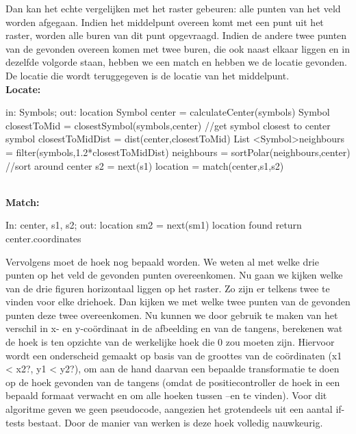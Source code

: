 \documentclass[eind]{penoverslag}
\begin{document}
Dan kan het echte vergelijken met het raster gebeuren: alle punten van het veld worden afgegaan. Indien het middelpunt overeen komt met een punt uit het raster, worden alle buren van dit punt opgevraagd. Indien de andere twee punten van de gevonden overeen komen met twee buren, die ook naast elkaar liggen en in dezelfde volgorde staan, hebben we een match en hebben we de locatie gevonden. De locatie die wordt teruggegeven is de locatie van het middelpunt.\\

\textbf{Locate: }
\begin{algorithmic}

	\STATE in: Symbols; out: location
	\STATE Symbol center = calculateCenter(symbols)
	\STATE Symbol closestToMid = closestSymbol(symbols,center)     //get symbol closest to center symbol
	\STATE closestToMidDist = dist(center,closestToMid)
	\STATE List \textless Symbol\textgreater neighbours = filter(symbols,1.2*closestToMidDist)
	\STATE neighbours = sortPolar(neighbours,center)     //sort around center
		\STATE s2 = next(s1) %
			\STATE location = match(center,s1,s2)
		\ENDIF
	\ENDFOR
	
\end{algorithmic}
~\\
\textbf{Match:}
\begin{algorithmic}
\STATE In: center, s1, s2; out: location
				\STATE sm2 = next(sm1)
					\STATE location found
					\STATE return center.coordinates
				\ENDIF
			\ENDFOR
		\ENDIF
	\ENDFOR
\end{algorithmic}

Vervolgens moet de hoek nog bepaald worden. We weten al met welke drie punten op het veld de gevonden punten overeenkomen. Nu gaan we kijken welke van de drie figuren horizontaal liggen op het raster. Zo zijn er telkens twee te vinden voor elke driehoek. Dan kijken we met welke twee punten van de gevonden punten deze twee overeenkomen. Nu kunnen we door gebruik te maken van het verschil in x- en y-co\"{o}rdinaat in de afbeelding en van de tangens, berekenen wat de hoek is ten opzichte van de werkelijke hoek die 0 zou moeten zijn.
Hiervoor wordt een onderscheid gemaakt op basis van de groottes van de coördinaten (x1 < x2?, y1 < y2?), om aan de hand daarvan een bepaalde transformatie te doen op de hoek gevonden van de tangens (omdat de positiecontroller de hoek in een bepaald formaat verwacht en om alle hoeken tussen –\pi en \pi te vinden). Voor dit algoritme geven we geen pseudocode, aangezien het grotendeels uit een aantal if-tests bestaat. Door de manier van werken is deze hoek volledig nauwkeurig.
\end{document}

